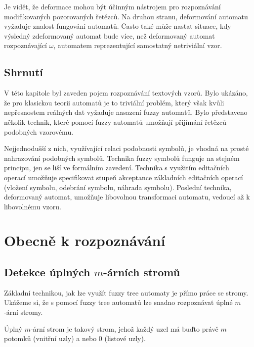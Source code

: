 \documentclass[a4paper,10pt]{article}
\begin{document}
Je vidět, že deformace mohou být účinným nástrojem pro rozpoznávání modifikovaných pozorovaných řetězců. Na druhou stranu, deformování automatu vyžaduje znalost fungování automatů. Často také může nastat situace, kdy výsledný zdeformovaný automat bude více, než deformovaný automat rozpoznávající $\omega$, automatem reprezentující samostatný netriviální vzor.

\subsection{Shrnutí}
V této kapitole byl zaveden pojem rozpoznávání textových vzorů. Bylo ukázáno, že pro klasickou teorii automatů je to triviální problém, který však kvůli nepřesnostem reálných dat vyžaduje nasazení fuzzy automatů. Bylo představeno několik technik, které pomocí fuzzy automatů umožňují přijímání řetězců podobných vzorovému. 

Nejjednodušší z nich, využívající relaci podobnosti symbolů, je vhodná na prosté nahrazování podobných symbolů. Technika fuzzy symbolů funguje na stejném principu, jen se liší ve formálním zavedení. Technika s využitím editačních operací umožňuje specifikovat stupeň akceptance základních editačních operací (vložení symbolu, odebrání symbolu, náhrada symbolu). Poslední technika, deformovaný automat, umožňuje libovolnou transformaci automatu, vedoucí až k libovolnému vzoru.

\section{Obecně k rozpoznávání}

\subsection{Detekce úplných $m$-árních stromů}
Základní technikou, jak lze využít fuzzy tree automaty je přímo práce se stromy. Ukážeme si, že s pomocí fuzzy tree automatů lze snadno rozpoznávat úplné $m$-ární stromy. 

\begin{definition}
 Úplný $m$-ární strom je takový strom, jehož každý uzel má buďto právě $m$ potomků (vnitřní uzly) a nebo $0$ (listové uzly).
\end{definition}
\end{document}
